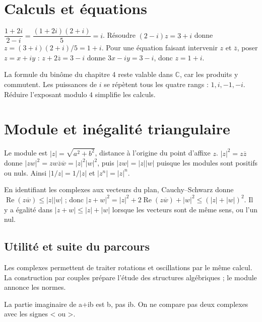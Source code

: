 \documentclass[../cours_tle.tex]{subfiles}
\begin{document}
\section{Calculs et équations}
\begin{exemple}
$\dfrac{1+2i}{2-i}=\dfrac{(1+2i)(2+i)}5=i$.
Résoudre $(2-i)z=3+i$ donne $z=(3+i)(2+i)/5=1+i$.
Pour une équation faisant intervenir $z$ et $\overline z$, poser $z=x+iy$ :
$z+2\overline z=3-i$ donne $3x-iy=3-i$, donc $z=1+i$.
\end{exemple}
La formule du binôme du chapitre 4 reste valable dans $\mathbb C$, car les produits y commutent.
Les puissances de $i$ se répètent tous les quatre rangs : $1,i,-1,-i$. Réduire l'exposant modulo $4$ simplifie les calculs.
\section{Module et inégalité triangulaire}
Le module est $|z|=\sqrt{a^2+b^2}$, distance à l'origine du point d'affixe $z$.
$|z|^2=z\overline z$ donne
$|zw|^2=zw\overline z\overline w=|z|^2|w|^2$, puis $|zw|=|z||w|$ puisque les modules sont positifs ou nuls.
Ainsi $|1/z|=1/|z|$ et $|z^n|=|z|^n$.

En identifiant les complexes aux vecteurs du plan, Cauchy--Schwarz donne
$\operatorname{Re}(z\overline w)\le|z||w|$ ; donc
$|z+w|^2=|z|^2+2\operatorname{Re}(z\overline w)+|w|^2\le(|z|+|w|)^2$.
Il y a égalité dans $|z+w|\le|z|+|w|$ lorsque les vecteurs sont de même sens, ou l'un nul.
\begin{finchapitre}
\section{Utilité et suite du parcours}
Les complexes permettent de traiter rotations et oscillations par le même calcul. La construction par couples prépare l'étude des structures algébriques ; le module annonce les normes.
\begin{retenir}
La partie imaginaire de a+ib est b, pas ib. On ne compare pas deux complexes avec les signes < ou >.
\end{retenir}
\end{finchapitre}
\end{document}
